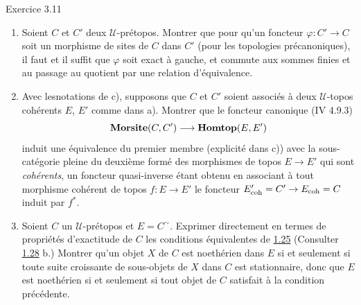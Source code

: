 \documentclass[10pt]{../fichiers-configuration-latex/smfart}
\begin{document}
\begin{enonce*}[remark]{Exercice 3.11}
\begin{enumerate}
\item Soient $C$ et $C'$ deux $𝒰$-prétopos. Montrer que pour qu'un
  foncteur $\varphi : C'\to C$ soit un morphisme de sites de $C$ dans
  $C'$ (pour les topologies précanoniques), il faut et il suffit que
  $\varphi$ soit exact à gauche, et commute aux sommes finies et au
  passage au quotient par une relation d'équivalence.

\item Avec les\pageoriginale notations de c), supposons que $C$ et $C'$ soient
  associés à deux $𝒰$-topos cohérents $E$, $E'$ comme dans a). Montrer
  que le foncteur canonique (IV 4.9.3)
$$
\Mmorsite (C, C') \to \Hhomtop(E, E')
$$
induit une équivalence du premier membre (explicité dans c)) avec la
sous-catégorie pleine du deuxième formé des morphismes de topos $E \to
E'$ qui sont \emph{cohérents}, un foncteur quasi-inverse étant obtenu
en associant à tout morphisme cohérent de topos $f : E \to E'$ le
foncteur $E'_{\coh} = C' \to E_{\coh} = C$ induit par $f^{\ast}$.

\item Soient $C$ un $𝒰$-prétopos et $E = C^{\sim}$. Exprimer
  directement en termes de propriétés d'exactitude de $C$ les
  conditions équivalentes de \hyperref[VI.cor1.25]{1.25} (Consulter \hyperref[VI.exer1.28]{1.28} b.) Montrer qu'un
  objet $X$ de $C$ est noethérien dans $E$ si et seulement si toute
  suite croissante de sous-objets de $X$ dans $C$ est stationnaire,
  donc que $E$ est noethérien si et seulement si tout objet de $C$
  satisfait à la condition précédente.
\end{enumerate}
\end{enonce*}
\end{document}
